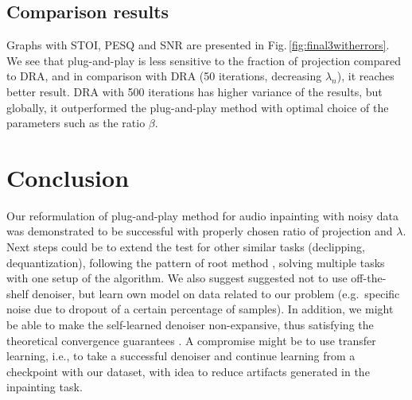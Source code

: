 \documentclass[conference]{IEEEtran}
\newcommand{\todo}[1]{\textcolor{red}{#1}}
\begin{document}
\subsection{Comparison results}





Graphs with STOI, PESQ and SNR are presented in Fig.\,\ref{fig:final3witherrors}.
We see that plug-and-play is less sensitive to the fraction of projection compared to DRA,
and in comparison with DRA (50 iterations, decreasing $\lambda_n$), it reaches better result.
DRA with 500 iterations has higher variance of the results, but globally, it outperformed the plug-and-play method with optimal choice of the parameters such as the ratio $\beta$.








\section{Conclusion}
\label{sec:conclusion}

Our reformulation of plug-and-play method for audio inpainting with noisy data was demonstrated to be successful with properly chosen ratio of projection and $\lambda$.
Next steps could be to extend the test for other similar tasks (declipping, dequantization), following the pattern of root method \cite{Chan2016}, solving multiple tasks with one setup of the algorithm.
We also suggest suggested not to use off-the-shelf denoiser, but learn own model on data related to our problem (e.g.\ specific noise due to dropout of a certain percentage of samples).
In addition,
we might be able to make the self-learned denoiser non-expansive, thus satisfying the theoretical convergence guarantees \cite{Venkatakrishnan2013,Chan2016}.
A compromise might be to use transfer learning,
i.e., to take a successful denoiser and continue learning from a checkpoint with our dataset,
with idea to reduce artifacts generated in the inpainting task.
\end{document}
